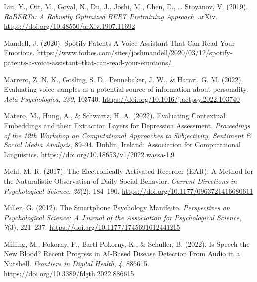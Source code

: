 \documentclass[
  english,
  man,floatsintext]{apa6}
\newlength{\cslhangindent}
\newenvironment{CSLReferences}[2] %
 {%
  \setlength{\parindent}{0pt}
  \ifodd #1 \everypar{\setlength{\hangindent}{\cslhangindent}}\ignorespaces\fi
  \ifnum #2 > 0
  \setlength{\parskip}{#2\baselineskip}
  \fi
 }%
 {}
\begin{document}
\begin{CSLReferences}{1}{0}
\leavevmode{}%
Liu, Y., Ott, M., Goyal, N., Du, J., Joshi, M., Chen, D., \ldots{} Stoyanov, V. (2019). \emph{{RoBERTa}: {A Robustly Optimized BERT Pretraining Approach}}. arXiv. \url{https://doi.org/10.48550/arXiv.1907.11692}

\leavevmode{}%
Mandell, J. (2020). Spotify {Patents A Voice Assistant That Can Read Your Emotions}. https://www.forbes.com/sites/joshmandell/2020/03/12/spotify-patents-a-voice-assistant--that-can-read-your-emotions/.

\leavevmode{}%
Marrero, Z. N. K., Gosling, S. D., Pennebaker, J. W., \& Harari, G. M. (2022). Evaluating voice samples as a potential source of information about personality. \emph{Acta Psychologica}, \emph{230}, 103740. \url{https://doi.org/10.1016/j.actpsy.2022.103740}

\leavevmode{}%
Matero, M., Hung, A., \& Schwartz, H. A. (2022). Evaluating {Contextual Embeddings} and their {Extraction Layers} for {Depression Assessment}. \emph{Proceedings of the 12th {Workshop} on {Computational Approaches} to {Subjectivity}, {Sentiment} \& {Social Media Analysis}}, 89--94. Dublin, Ireland: Association for Computational Linguistics. \url{https://doi.org/10.18653/v1/2022.wassa-1.9}

\leavevmode{}%
Mehl, M. R. (2017). The {Electronically Activated Recorder} ({EAR}): {A Method} for the {Naturalistic Observation} of {Daily Social Behavior}. \emph{Current Directions in Psychological Science}, \emph{26}(2), 184--190. \url{https://doi.org/10.1177/0963721416680611}

\leavevmode{}%
Miller, G. (2012). The {Smartphone Psychology Manifesto}. \emph{Perspectives on Psychological Science: A Journal of the Association for Psychological Science}, \emph{7}(3), 221--237. \url{https://doi.org/10.1177/1745691612441215}

\leavevmode{}%
Milling, M., Pokorny, F., Bartl-Pokorny, K., \& Schuller, B. (2022). Is {Speech} the {New Blood}? {Recent Progress} in {AI-Based Disease Detection From Audio} in a {Nutshell}. \emph{Frontiers in Digital Health}, \emph{4}, 886615. \url{https://doi.org/10.3389/fdgth.2022.886615}


\end{CSLReferences}
\end{document}

